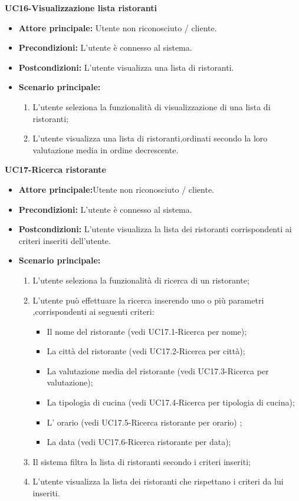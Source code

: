 \textbf{UC16-Visualizzazione lista ristoranti}
\begin{itemize}
\item \textbf{Attore principale:} Utente non riconosciuto / cliente.
\item \textbf{Precondizioni:} L'utente è connesso al sistema.
\item \textbf{Postcondizioni:} L'utente visualizza una lista di ristoranti.
\item \textbf{Scenario principale:}
\begin{enumerate}
    \item L'utente seleziona la funzionalità di visualizzazione di una lista di ristoranti;
    \item L'utente visualizza una lista di ristoranti,ordinati secondo la loro valutazione media in ordine decrescente.
\end{enumerate}
\end{itemize}

\textbf{UC17-Ricerca ristorante}
\begin{itemize}
\item \textbf{Attore principale:}Utente non riconosciuto / cliente.
\item \textbf{Precondizioni:} L'utente è connesso al sistema.
\item \textbf{Postcondizioni:} L'utente visualizza la lista dei ristoranti corrispondenti ai criteri inseriti
dell'utente.
\item \textbf{Scenario principale:}
\begin{enumerate}
    \item L'utente seleziona la funzionalità di ricerca di un ristorante;
    \item L'utente può effettuare la ricerca inserendo uno o più parametri ,corrispondenti
    ai seguenti criteri:
    \begin{itemize}
        \item Il nome del ristorante (vedi UC17.1-Ricerca per nome);
        \item La città del ristorante (vedi UC17.2-Ricerca per città);
        \item La valutazione media del ristorante (vedi UC17.3-Ricerca per valutazione);
        \item La tipologia di cucina (vedi UC17.4-Ricerca per tipologia di cucina);
        \item L' orario (vedi UC17.5-Ricerca ristorante per orario) ;
        \item La data (vedi UC17.6-Ricerca ristorante per data); 
    \end{itemize}
    \item  Il sistema filtra la lista di ristoranti secondo i criteri inseriti;
    \item L'utente visualizza la lista dei ristoranti che rispettano i criteri da lui inseriti.
\end{enumerate}
\end{itemize}

